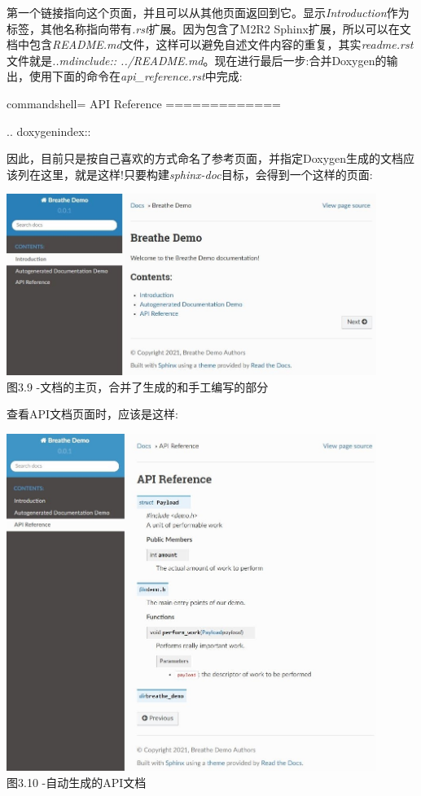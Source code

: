 第一个链接指向这个页面，并且可以从其他页面返回到它。显示\textit{Introduction}作为标签，其他名称指向带有\textit{.rst}扩展。因为包含了M2R2 Sphinx扩展，所以可以在文档中包含\textit{README.md}文件，这样可以避免自述文件内容的重复，其实\textit{readme.rst}文件就是\textit{..mdinclude:: ../README.md}。现在进行最后一步:合并Doxygen的输出，使用下面的命令在\textit{api\_reference.rst}中完成:

\begin{tcblisting}{commandshell={}}
API Reference
=============

.. doxygenindex::

\end{tcblisting}

因此，目前只是按自己喜欢的方式命名了参考页面，并指定Doxygen生成的文档应该列在这里，就是这样!只要构建\textit{sphinx-doc}目标，会得到一个这样的页面:

\begin{center}
\includegraphics[width=0.9\textwidth]{content/1/chapter3/images/9.jpg}\\
图3.9 -文档的主页，合并了生成的和手工编写的部分
\end{center}

查看API文档页面时，应该是这样:

\begin{center}
\includegraphics[width=0.9\textwidth]{content/1/chapter3/images/10.jpg}\\
图3.10 -自动生成的API文档
\end{center}

